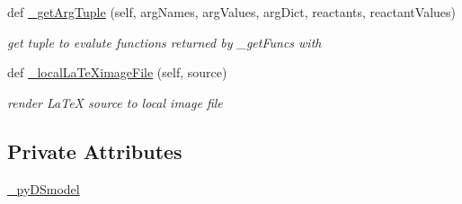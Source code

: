 \begin{DoxyCompactItemize}
def \hyperlink{class_mu_mo_t_1_1_mu_mo_t_1_1_mu_mo_tmodel_af547c59d7ec82de308ee85b118fc7295}{\+\_\+get\+Arg\+Tuple} (self, arg\+Names, arg\+Values, arg\+Dict, reactants, reactant\+Values)
\begin{DoxyCompactList}\small\item\em get tuple to evalute functions returned by \+\_\+get\+Funcs with \end{DoxyCompactList}\item 
def \hyperlink{class_mu_mo_t_1_1_mu_mo_t_1_1_mu_mo_tmodel_ad1478cdd69a86f50f84e0528f829573c}{\+\_\+local\+La\+Te\+Ximage\+File} (self, source)
\begin{DoxyCompactList}\small\item\em render La\+TeX source to local image file \end{DoxyCompactList}\end{DoxyCompactItemize}
\subsection*{Private Attributes}
\begin{DoxyCompactItemize}
\item 
\hyperlink{class_mu_mo_t_1_1_mu_mo_t_1_1_mu_mo_tmodel_a9e9a430da6d323cc4411c070e0c7eee5}{\+\_\+py\+D\+Smodel}
\end{DoxyCompactItemize}
